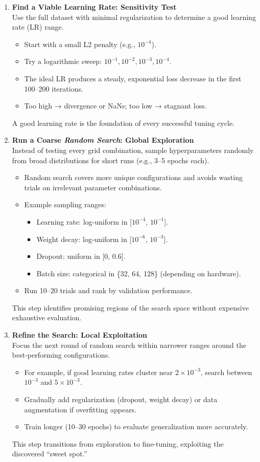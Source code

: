 \begin{enumerate}
	\item \textbf{Find a Viable Learning Rate: Sensitivity Test}\\
	Use the full dataset with minimal regularization to determine a good learning rate (LR) range.
	\begin{itemize}
		\item Start with a small L2 penalty (e.g., \( 10^{-4} \)).
		\item Try a logarithmic sweep: \( 10^{-1}, 10^{-2}, 10^{-3}, 10^{-4} \).
		\item The ideal LR produces a steady, exponential loss decrease in the first 100–200 iterations.
		\item Too high → divergence or NaNs; too low → stagnant loss.
	\end{itemize}
	A good learning rate is the foundation of every successful tuning cycle.
	
	\item \textbf{Run a Coarse \emph{Random Search}: Global Exploration}\\
	Instead of testing every grid combination, sample hyperparameters randomly from broad distributions for short runs (e.g., 3–5 epochs each).
	\begin{itemize}
		\item Random search covers more unique configurations and avoids wasting trials on irrelevant parameter combinations.
		\item Example sampling ranges:
		\begin{itemize}
			\item Learning rate: log-uniform in [\(10^{-4}\), \(10^{-1}\)].
			\item Weight decay: log-uniform in [\(10^{-6}\), \(10^{-3}\)].
			\item Dropout: uniform in [0, 0.6].
			\item Batch size: categorical in \{32, 64, 128\} (depending on hardware).
		\end{itemize}
		\item Run 10–20 trials and rank by validation performance.
	\end{itemize}
	This step identifies promising regions of the search space without expensive exhaustive evaluation.
	
	\newpage
	
	\item \textbf{Refine the Search: Local Exploitation}\\
	Focus the next round of random search within narrower ranges around the best-performing configurations.
	\begin{itemize}
		\item For example, if good learning rates cluster near \(2 \times 10^{-3}\), search between \(10^{-3}\) and \(5 \times 10^{-3}\).
		\item Gradually add regularization (dropout, weight decay) or data augmentation if overfitting appears.
		\item Train longer (10–30 epochs) to evaluate generalization more accurately.
	\end{itemize}
	This step transitions from exploration to fine-tuning, exploiting the discovered “sweet spot.”
	

\end{enumerate}
